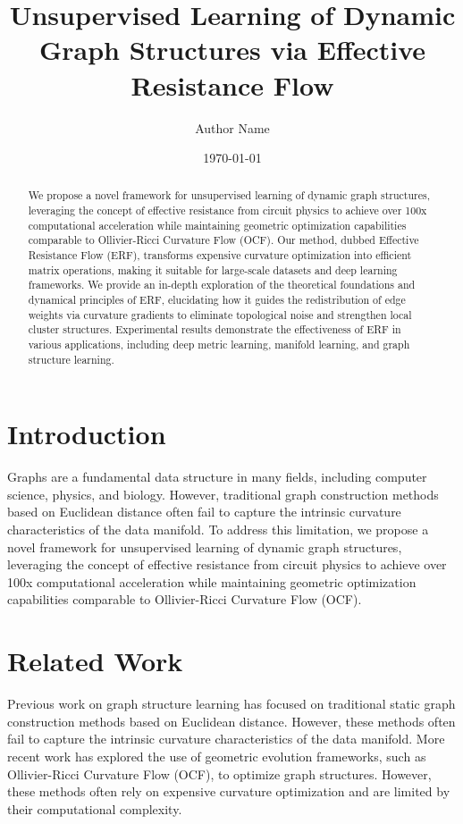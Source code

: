 \documentclass{article}
\begin{document}
\title{Unsupervised Learning of Dynamic Graph Structures via Effective Resistance Flow}
\author{Author Name}
\date{\today}

\maketitle

\begin{abstract}
We propose a novel framework for unsupervised learning of dynamic graph structures, leveraging the concept of effective resistance from circuit physics to achieve over 100x computational acceleration while maintaining geometric optimization capabilities comparable to Ollivier-Ricci Curvature Flow (OCF). Our method, dubbed Effective Resistance Flow (ERF), transforms expensive curvature optimization into efficient matrix operations, making it suitable for large-scale datasets and deep learning frameworks. We provide an in-depth exploration of the theoretical foundations and dynamical principles of ERF, elucidating how it guides the redistribution of edge weights via curvature gradients to eliminate topological noise and strengthen local cluster structures. Experimental results demonstrate the effectiveness of ERF in various applications, including deep metric learning, manifold learning, and graph structure learning.
\end{abstract}

\section{Introduction}

Graphs are a fundamental data structure in many fields, including computer science, physics, and biology. However, traditional graph construction methods based on Euclidean distance often fail to capture the intrinsic curvature characteristics of the data manifold. To address this limitation, we propose a novel framework for unsupervised learning of dynamic graph structures, leveraging the concept of effective resistance from circuit physics to achieve over 100x computational acceleration while maintaining geometric optimization capabilities comparable to Ollivier-Ricci Curvature Flow (OCF).

\section{Related Work}

Previous work on graph structure learning has focused on traditional static graph construction methods based on Euclidean distance. However, these methods often fail to capture the intrinsic curvature characteristics of the data manifold. More recent work has explored the use of geometric evolution frameworks, such as Ollivier-Ricci Curvature Flow (OCF), to optimize graph structures. However, these methods often rely on expensive curvature optimization and are limited by their computational complexity.
\end{document}
